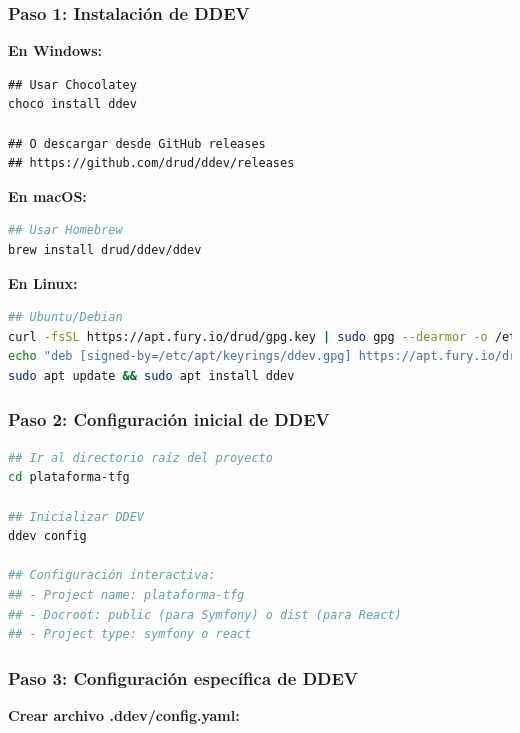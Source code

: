 \documentclass[12pt,a4paper,oneside]{report}
\begin{document}
\subsubsection{Paso 1: Instalación de
DDEV}\label{paso-1-instalaciuxf3n-de-ddev}

\textbf{En Windows:}

\begin{lstlisting}
## Usar Chocolatey
choco install ddev

## O descargar desde GitHub releases
## https://github.com/drud/ddev/releases
\end{lstlisting}

\textbf{En macOS:}

\begin{lstlisting}[language=bash]
## Usar Homebrew
brew install drud/ddev/ddev
\end{lstlisting}

\textbf{En Linux:}

\begin{lstlisting}[language=bash]
## Ubuntu/Debian
curl -fsSL https://apt.fury.io/drud/gpg.key | sudo gpg --dearmor -o /etc/apt/keyrings/ddev.gpg
echo "deb [signed-by=/etc/apt/keyrings/ddev.gpg] https://apt.fury.io/drud/ * *" | sudo tee /etc/apt/sources.list.d/ddev.list
sudo apt update && sudo apt install ddev
\end{lstlisting}

\subsubsection{Paso 2: Configuración inicial de
DDEV}\label{paso-2-configuraciuxf3n-inicial-de-ddev}

\begin{lstlisting}[language=bash]
## Ir al directorio raíz del proyecto
cd plataforma-tfg

## Inicializar DDEV
ddev config

## Configuración interactiva:
## - Project name: plataforma-tfg
## - Docroot: public (para Symfony) o dist (para React)
## - Project type: symfony o react
\end{lstlisting}

\subsubsection{Paso 3: Configuración específica de
DDEV}\label{paso-3-configuraciuxf3n-especuxedfica-de-ddev}

\textbf{Crear archivo .ddev/config.yaml:}
\end{document}
